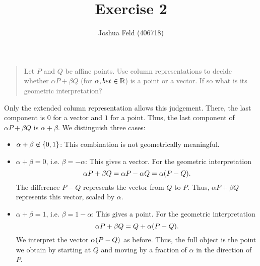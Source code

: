 \documentclass[english]{exercise}
\title{Exercise 2}
\author{Joshua Feld (406718)}
\begin{document}
    \maketitle
    

    \section{}
    
    \begin{quote}
        Let \(P\) and \(Q\) be affine points.
        Use column representations to decide whether \(\alpha P + \beta Q\) (for \(\alpha, bet \in \R\)) is a point or a vector.
        If so what is its geometric interpretation?
    \end{quote}

    Only the extended column representation allows this judgement.
    There, the last component is \(0\) for a vector and \(1\) for a point.
    Thus, the last component of \(\alpha P + \beta Q\) is \(\alpha + \beta\).
    We distinguish three cases:
    \begin{itemize}
        \item \(\alpha + \beta \not\in \braces*{0, 1}\): This combination is not geometrically meaningful.
        \item \(\alpha + \beta = 0\), i.e. \(\beta = -\alpha\): This gives a vector.
        For the geometric interpretation
        \[
            \alpha P + \beta Q = \alpha P - \alpha Q = \alpha\parentheses*{P - Q}.
        \]
        The difference \(P - Q\) represents the vector from \(Q\) to \(P\).
        Thus, \(\alpha P + \beta Q\) represents this vector, scaled by \(\alpha\).
        \item \(\alpha + \beta = 1\), i.e. \(\beta = 1 - \alpha\): This gives a point.
        For the geometric interpretation
        \[
            \alpha P + \beta Q = Q + \alpha\parentheses*{P - Q}.
        \]
        We interpret the vector \(\alpha\parentheses*{P - Q}\) as before.
        Thus, the full object is the point we obtain by starting at \(Q\) and moving by a fraction of \(\alpha\) in the direction of \(P\).
    \end{itemize}
    
    
    \section{}
    
\end{document}
